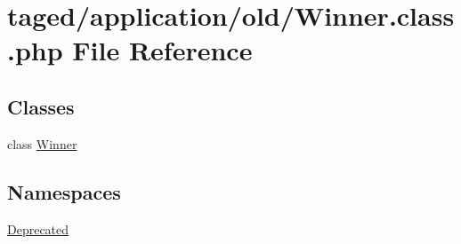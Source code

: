 \hypertarget{_winner_8class_8php}{}\section{taged/application/old/\+Winner.class.\+php File Reference}
\label{_winner_8class_8php}
\subsection*{Classes}
\begin{DoxyCompactItemize}
\item 
class \hyperlink{class_winner}{Winner}
\end{DoxyCompactItemize}
\subsection*{Namespaces}
\begin{DoxyCompactItemize}
\item 
 \hyperlink{namespace_deprecated}{Deprecated}
\end{DoxyCompactItemize}
